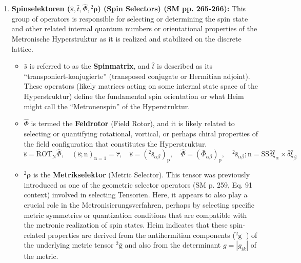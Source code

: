 \documentclass[12pt]{article}
\newcommand{\q}[1]{\enquote{#1}}
\newcommand{\kompositionsfeld}{{}^2\bar{\mathrm{g}}}
\begin{document}
\begin{itemize}
\begin{enumerate}
        \begin{equation}
        \mathrm{C_k} = \varkappa_\mathrm{k} \sqrt[\mathrm{p}]{\tau} (\ )_\mathrm{k}, \quad \mathrm{x_k} = \mathrm{C_k};\mathrm{n}, \quad \mathrm{C_k} = \mathrm{X_k}, \quad {}^2\bar{\gamma};\mathrm{n} = \text{const}, \quad \mathrm{C_k} \neq \mathrm{X_k}, \quad {}^2\bar{\gamma};\mathrm{n} = {}^2\bar{\mathrm{g}} \tag{86b}
        \end{equation}
        \item \textbf{Spinselektoren (\( \hat{s}, \hat{t}, \hat{\Phi}, {}^2\bm{\rho} \)) (Spin Selectors) (SM pp. 265-266):} This group of operators is responsible for selecting or determining the spin state and other related internal quantum numbers or orientational properties of the Metronische Hyperstruktur as it is realized and stabilized on the discrete lattice.
        \begin{itemize}
            \item \( \hat{s} \) is referred to as the \textbf{Spinmatrix}, and \( \hat{t} \) is described as its \q{transponiert-konjugierte} (transposed conjugate or Hermitian adjoint). These operators (likely matrices acting on some internal state space of the Hyperstruktur) define the fundamental spin orientation or what Heim might call the \q{Metronenspin} of the Hyperstruktur.
            \item \( \hat{\Phi} \) is termed the \textbf{Feldrotor} (Field Rotor), and it is likely related to selecting or quantifying rotational, vortical, or perhaps chiral properties of the field configuration that constitutes the Hyperstruktur.
            \begin{equation}
            \hat{\mathrm{s}} = \mathrm{ROT_N} \hat{\Phi}, \quad (\hat{\mathrm{s}};\mathrm{n})_{\mathrm{n=1}} = \hat{\tau}, \quad \hat{\mathrm{s}} = ({}^2\bar{\mathrm{s}}_{\alpha\beta})_\mathrm{p}, \quad \hat{\Phi} = (\bar{\Phi}_{\alpha\beta})_\mathrm{p}, \quad {}^2\bar{\mathrm{s}}_{\alpha\beta};\mathrm{n} = \mathrm{SS} \bar{\delta}\bar{\xi}_\alpha \times \bar{\delta}\bar{\xi}_\beta \tag{87}
            \end{equation}
            \item \( {}^2\bm{\rho} \) is the \textbf{Metrikselektor} (Metric Selector). This tensor was previously introduced as one of the geometric selector operators (SM p. 259, Eq. 91 context) involved in selecting Tensorien. Here, it appears to also play a crucial role in the Metronisierungsverfahren, perhaps by selecting specific metric symmetries or quantization conditions that are compatible with the metronic realization of spin states. Heim indicates that these spin-related properties are derived from the antihermitian components (\( \kompositionsfeld^- \)) of the underlying metric tensor \( \kompositionsfeld \) and also from the determinant \( g = |g_{ik}| \) of the metric.

\end{itemize}
\end{enumerate}
\end{itemize}
\end{document}
